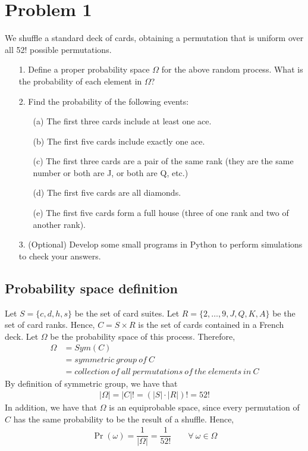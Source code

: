 
\section{Problem 1}

We shuffle a standard deck of cards, obtaining a permutation that is uniform over all
52! possible permutations.
\begin{itemize}
	\item[1.] Define a proper probability space $\Omega$ for the above random process. What is the probability of each element in $\Omega$?
	\item[2.] Find the probability of the following events:
	\begin{itemize}
		\item[(a)] The first three cards include at least one ace.
		\item[(b)] The first five cards include exactly one ace.
		\item[(c)] The first three cards are a pair of the same rank (they are the same number or both are J, or both are Q, etc.)
		\item[(d)] The first five cards are all diamonds.
		\item[(e)] The first five cards form a full house (three of one rank and two of another rank).		
	\end{itemize}
	\item[3.] (Optional) Develop some small programs in Python to perform simulations to check your answers.
\end{itemize}


\subsection{Probability space definition}
Let $S = \{c, d, h, s\}$ be the set of card suites. Let $R = \{2, \ldots, 9, J, Q, K, A\}$ be the set of card ranks. Hence, $C = S \times R$ is the set of cards contained in a French deck. Let $\Omega$ be the probability space of this process. Therefore,
\begin{align*}
	\Omega &= Sym(C)\\
		&= symmetric \ group \ of \ C\\
		&= collection \ of \ all \ permutations \ of \ the \ elements \ in \ C
\end{align*}
By definition of symmetric group\cite{sym_group}, we have that
\begin{align*}
	|\Omega| = |C|! = (|S| \cdot |R|)! = 52!
\end{align*}
In addition, we have that $\Omega$ is an equiprobable space, since every permutation of $C$ has the same probability to be the result of a shuffle. Hence,
\begin{align*}
	\Pr(\omega) = \dfrac{1}{|\Omega|} = \dfrac{1}{52!} \qquad \forall \ \omega\in\Omega
\end{align*}


